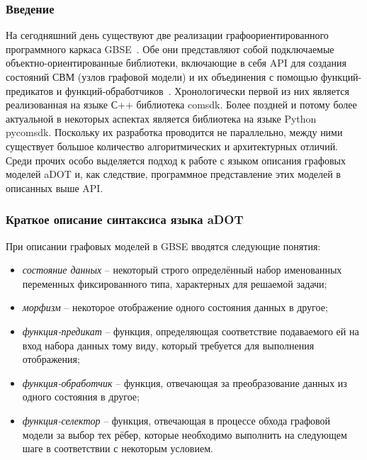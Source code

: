 \def\notedate{2022.02.09}
\def\currentauthor{Тришин И.В. (РК6)}

\subsubsection{Введение}

На сегодняшний день существуют две реализации графоориентированного программного каркаса GBSE~\cite{SokolovPershin2018}. Обе они представляют собой подключаемые объектно-ориентированные библиотеки, включающие в себя API для создания состояний СВМ (узлов графовой модели) и их объединения с помощью функций-предикатов и функций-обработчиков~\cite{SokolovPershin2018}. Хронологически первой из них является реализованная на языке С++ библиотека comsdk. Более поздней и потому более актуальной в некоторых аспектах является библиотека на языке Python pycomsdk. Поскольку их разработка проводится не параллельно, между ними существует большое количество алгоритмических и архитектурных отличий. Среди прочих особо выделяется подход к работе с языком описания графовых моделей aDOT и, как следствие, программное представление этих моделей в описанных выше API.

\subsubsection{Краткое описание синтаксиса языка aDOT}

При описании графовых моделей в GBSE вводятся следующие понятия:
\begin{itemize}
    \item \textit{состояние данных} -- некоторый строго определённый набор именованных переменных фиксированного типа, характерных для решаемой задачи;
    \item \textit{морфизм} -- некоторое отображение одного состояния данных в другое;
    \item \textit{функция-предикат} -- функция, определяющая соответствие подаваемого ей на вход набора данных тому виду, который требуется для выполнения отображения;
    \item \textit{функция-обработчик} -- функция, отвечающая за преобразование данных из одного состояния в другое;
    \item \textit{функция-селектор} -- функция, отвечающая в процессе обхода графовой модели за выбор тех рёбер, которые необходимо выполнить на следующем шаге в соответствии с некоторым условием.
\end{itemize}

